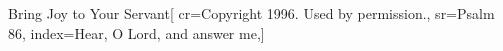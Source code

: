 {Bring Joy to Your Servant}[
    cr={Copyright 1996.  Used by permission.},
    sr={Psalm 86},
    index={Hear, O Lord, and answer me,}]
